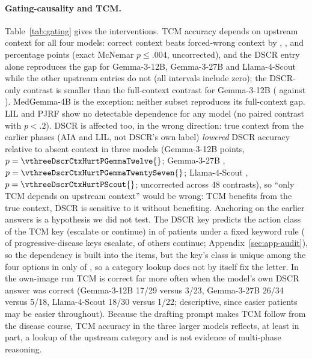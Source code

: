 \documentclass[11pt]{article}
\begin{document}
\paragraph{Gating-causality and TCM.} Table~\ref{tab:gating} gives the interventions. TCM accuracy depends on upstream context for all four models: correct context beats forced-wrong context by \vthreeTcmGapMedGemma{}, \vthreeTcmGapGemmaTwelve{}, \vthreeTcmGapGemmaTwentySeven{} and \vthreeTcmGapScout{} percentage points (exact McNemar $p\le.004$, uncorrected), and the DSCR entry alone reproduces the gap for Gemma-3-12B, Gemma-3-27B and Llama-4-Scout while the other upstream entries do not (all intervals include zero); the DSCR-only contrast is smaller than the full-context contrast for Gemma-3-12B (\vthreeTcmDscrOnlyGemmaTwelve{} against \vthreeTcmGapGemmaTwelve{}). MedGemma-4B is the exception: neither subset reproduces its full-context gap. LIL and PJRF show no detectable dependence for any model (no paired contrast with $p<.2$). DSCR is affected too, in the wrong direction: true context from the earlier phases (AIA and LIL, not DSCR\textquoteright s own label) \emph{lowered} DSCR accuracy relative to absent context in three models (Gemma-3-12B \vthreeDscrCtxHurtGemmaTwelve{} points, $p=\vthreeDscrCtxHurtPGemmaTwelve{}$; Gemma-3-27B \vthreeDscrCtxHurtGemmaTwentySeven{}, $p=\vthreeDscrCtxHurtPGemmaTwentySeven{}$; Llama-4-Scout \vthreeDscrCtxHurtScout{}, $p=\vthreeDscrCtxHurtPScout{}$; uncorrected across 48 contrasts), so ``only TCM depends on upstream context'' would be wrong: TCM benefits from the true context, DSCR is sensitive to it without benefiting. Anchoring on the earlier answers is a hypothesis we did not test. The DSCR key predicts the action class of the TCM key (escalate or continue) in \tcmAgree{} of \tcmN{} patients under a fixed keyword rule (\tcmPdEsc{} of \tcmPdN{} progressive-disease keys escalate, \tcmNonCont{} of \tcmNonN{} others continue; Appendix~\ref{sec:app-audit}), so the dependency is built into the items, but the key\textquoteright s class is unique among the four options in only \tcmClassUnique{} of \tcmN{}, so a category lookup does not by itself fix the letter. In the own-image run TCM is correct far more often when the model\textquoteright s own DSCR answer was correct (Gemma-3-12B 17/29 versus 3/23, Gemma-3-27B 26/34 versus 5/18, Llama-4-Scout 18/30 versus 1/22; descriptive, since easier patients may be easier throughout). Because the drafting prompt makes TCM follow from the disease course, TCM accuracy in the three larger models reflects, at least in part, a lookup of the upstream category and is not evidence of multi-phase reasoning.
\end{document}
